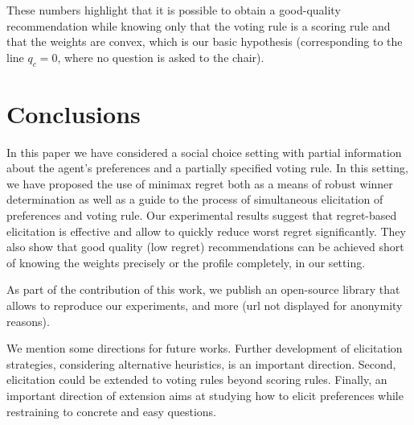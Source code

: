 \documentclass[sigconf, anonymous]{aamas}
\begin{document}
These numbers highlight that it is possible to obtain a good-quality recommendation while knowing only that the voting rule is a scoring rule and that the weights are convex, which is our basic hypothesis (corresponding to the line $q_c = 0$, where no question is asked to the chair).

\section{Conclusions}  
\label{sec:conclusions}
In this paper we have considered a social choice setting with partial information about the agent's preferences and a partially specified voting rule.
In this setting, we have proposed the use of minimax regret both as a means of robust winner determination as well as a guide to the process of simultaneous elicitation of preferences and voting rule.
Our experimental results %
suggest that regret-based elicitation is effective and allow to quickly reduce worst regret significantly. They also show that good quality (low regret) recommendations can be achieved short of knowing the weights precisely or the profile completely, in our setting.

As part of the contribution of this work, we publish an open-source library that allows to reproduce our experiments, and more (url not displayed for anonymity reasons).

We mention some directions for future works.
Further development of elicitation strategies, considering alternative heuristics, is an important direction. 
Second, elicitation could be extended to voting rules beyond scoring rules. 
Finally, an important direction of extension aims at studying how to elicit preferences while restraining to concrete and easy questions.


\end{document}
